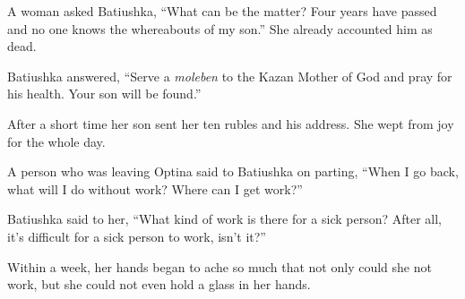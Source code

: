 A woman asked Batiushka, ``What can be the matter? Four years have passed and no one knows the whereabouts of my son.'' She already accounted him as dead.

Batiushka answered, ``Serve a \textit{moleben} to the Kazan Mother of God and pray for his health. Your son will be found.''

After a short time her son sent her ten rubles and his address. She wept from joy for the whole day.

A person who was leaving Optina said to Batiushka on parting, ``When I go back, what will I do without work? Where can I get work?''

Batiushka said to her, ``What kind of work is there for a sick person? After all, it's difficult for a sick person to work, isn't it?''

Within a week, her hands began to ache so much that not only could she not work, but she could not even hold a glass in her hands.


